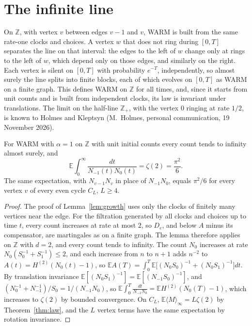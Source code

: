 \documentclass[11pt]{amsart}
\theoremstyle{remark}\newtheorem{remark}[theorem]{Remark}
\begin{document}
\section{The infinite line}\label{sec:line}
On $\mathbb{Z}$, with vertex $v$ between edges $v-1$ and $v$, WARM is built from the same rate-one clocks and
choices. A vertex $w$ that does not ring during $[0,T]$ separates the line on that interval: the edges to the left of $w$
change only at rings to the left of $w$, which depend only on those edges, and similarly on the right. Each vertex is
silent on $[0,T]$ with probability $e^{-T}$, independently, so almost surely the line splits into finite blocks, each of
which evolves on $[0,T]$ as WARM on a finite graph. This defines WARM on $\mathbb{Z}$ for all times, and, since it starts from unit counts and is built from
independent clocks, its law is invariant under translations. The limit on the half-line $\mathbb{Z}_+$, with the
vertex $0$ ringing at rate $1/2$, is known to Holmes and Kleptsyn (M.~Holmes, personal communication, 19 November 2026).

\begin{proposition}\label{prop:line}
For WARM with $\alpha=1$ on $\mathbb{Z}$ with unit initial counts every count tends to infinity almost surely, and
\[ \mathbb{E}\int_0^\infty\frac{dt}{N_{-1}(t)N_0(t)}=\zeta(2)=\frac{\pi^2}{6}. \]
The same expectation, with $N_{v-1}N_v$ in place of $N_{-1}N_0$, equals $\pi^2/6$ for every vertex $v$ of every even cycle
$C_L$, $L\ge4$.
\end{proposition}
\begin{proof}
The proof of Lemma~\ref{lem:growth} uses only the clocks of finitely many
vertices near the edge. For the filtration generated by all clocks and choices up to time $t$, every count increases
at rate at most $2$, so $D_e$, and below $A$ minus its compensator, are martingales as on a finite graph. The lemma
therefore applies on $\mathbb{Z}$ with $d=2$, and every count tends to infinity. The count $N_0$ increases at rate $N_0(S_0^{-1}+S_1^{-1})\le2$,
and each increase from $n$ to $n+1$ adds $n^{-2}$ to $A(t)=H^{(2)}(N_0(t)-1)$, so
$\mathbb{E}A(T)=\int_0^T\mathbb{E}\bigl[(N_0S_0)^{-1}+(N_0S_1)^{-1}\bigr]dt$. By translation invariance
$\mathbb{E}[(N_0S_1)^{-1}]=\mathbb{E}[(N_{-1}S_0)^{-1}]$, and $(N_0^{-1}+N_{-1}^{-1})/S_0=1/(N_{-1}N_0)$, so
$\mathbb{E}\int_0^T\frac{dt}{N_{-1}N_0}=\mathbb{E}H^{(2)}(N_0(T)-1)$, which increases to $\zeta(2)$ by bounded
convergence. On $C_L$, $\mathbb{E}\langle M\rangle_\infty=L\zeta(2)$ by Theorem~\ref{thm:law}, and the $L$ vertex terms
have the same expectation by rotation invariance.
\end{proof}
\end{document}
